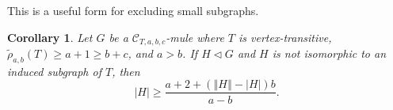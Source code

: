 \documentclass[12pt]{amsart}
\theoremstyle{plain}
\newtheorem{lem}[thm]{Lemma}
\newtheorem{cor}[thm]{Corollary}
\theoremstyle{definition}
\theoremstyle{remark}
\newcommand{\fancy}[1]{\mathcal{#1}}
\newcommand{\C}{\fancy{C}}
\newcommand{\IN}{\mathbb{N}}
\newcommand{\card}[1]{\left|#1\right|}
\newcommand{\size}[1]{\left\Vert#1\right\Vert}
\newcommand{\func}[3]{#1\colon #2 \rightarrow #3}
\newcommand{\irange}[1]{\left[#1\right]}
\newcommand{\parens}[1]{\left( #1 \right)}
\begin{document}
This is a useful form for excluding small subgraphs.
\begin{cor}
Let $G$ be a $\C_{T,a,b,c}$-mule where $T$ is vertex-transitive, $\tilde{\rho}_{a,b}(T) \ge a + 1 \ge b + c$, and $a > b$.  If $H \lhd G$ and $H$ is not isomorphic to an induced subgraph of $T$, then 
\[\card{H} \ge \frac{a + 2 + \parens{\size{H} - \card{H}}b}{a-b}.\]
\end{cor}

%



\end{document}
